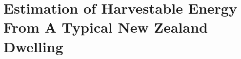 \documentclass[10pt,final,journal]{IEEEtran}
\begin{document}





    \section{Estimation of Harvestable Energy From A Typical New Zealand Dwelling}
    \label{sect:waterConsumption}

\end{document}
